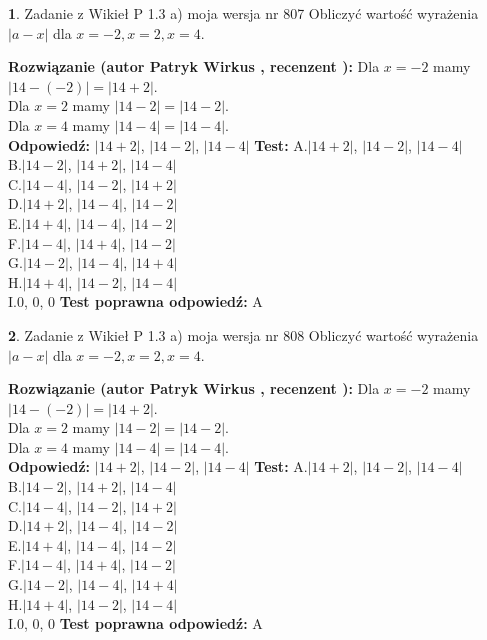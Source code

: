 \documentclass[12pt, a4paper]{article}
\theoremstyle{definition} %
\newtheorem{zad}{}
\newcommand{\zadStart}[1]{\begin{zad}#1\newline}
\newcommand{\zadStop}{\end{zad}}
\newcommand{\rozwStart}[2]{\noindent \textbf{Rozwiązanie (autor #1 , recenzent #2): }\newline}
\newcommand{\rozwStop}{\newline}
\newcommand{\odpStart}{\noindent \textbf{Odpowiedź:}\newline}
\newcommand{\odpStop}{\newline}
\newcommand{\testStart}{\noindent \textbf{Test:}\newline}
\newcommand{\testStop}{\newline}
\newcommand{\kluczStart}{\noindent \textbf{Test poprawna odpowiedź:}\newline}
\newcommand{\kluczStop}{\newline}
\begin{document}
\zadStart{Zadanie z Wikieł P 1.3 a) moja wersja nr 807}
Obliczyć wartość wyrażenia $|a - x|$ dla $x=-2,x=2,x=4$.
\zadStop
\rozwStart{Patryk Wirkus}{}
Dla $x = -2$ mamy $|14 - (-2)| = |14 + 2|$.\\
Dla $x = 2$ mamy $|14 - 2| = |14 - 2|$.\\
Dla $x = 4$ mamy $|14 - 4| = |14 - 4|$.\\
\rozwStop
\odpStart
$|14 + 2|$, $|14 - 2|$, $|14 - 4|$
\odpStop
\testStart
A.$|14 + 2|$, $|14 - 2|$, $|14 - 4|$\\
B.$|14 - 2|$, $|14 + 2|$, $|14 - 4|$\\
C.$|14 - 4|$, $|14 - 2|$, $|14 + 2|$\\
D.$|14 + 2|$, $|14 - 4|$, $|14 - 2|$\\
E.$|14 + 4|$, $|14 - 4|$, $|14 - 2|$\\
F.$|14 - 4|$, $|14 + 4|$, $|14 - 2|$\\
G.$|14 - 2|$, $|14 - 4|$, $|14 + 4|$\\
H.$|14 + 4|$, $|14 - 2|$, $|14 - 4|$\\
I.$0$, $0$, $0$
\testStop
\kluczStart
A
\kluczStop



\zadStart{Zadanie z Wikieł P 1.3 a) moja wersja nr 808}
Obliczyć wartość wyrażenia $|a - x|$ dla $x=-2,x=2,x=4$.
\zadStop
\rozwStart{Patryk Wirkus}{}
Dla $x = -2$ mamy $|14 - (-2)| = |14 + 2|$.\\
Dla $x = 2$ mamy $|14 - 2| = |14 - 2|$.\\
Dla $x = 4$ mamy $|14 - 4| = |14 - 4|$.\\
\rozwStop
\odpStart
$|14 + 2|$, $|14 - 2|$, $|14 - 4|$
\odpStop
\testStart
A.$|14 + 2|$, $|14 - 2|$, $|14 - 4|$\\
B.$|14 - 2|$, $|14 + 2|$, $|14 - 4|$\\
C.$|14 - 4|$, $|14 - 2|$, $|14 + 2|$\\
D.$|14 + 2|$, $|14 - 4|$, $|14 - 2|$\\
E.$|14 + 4|$, $|14 - 4|$, $|14 - 2|$\\
F.$|14 - 4|$, $|14 + 4|$, $|14 - 2|$\\
G.$|14 - 2|$, $|14 - 4|$, $|14 + 4|$\\
H.$|14 + 4|$, $|14 - 2|$, $|14 - 4|$\\
I.$0$, $0$, $0$
\testStop
\kluczStart
A
\kluczStop
\end{document}
